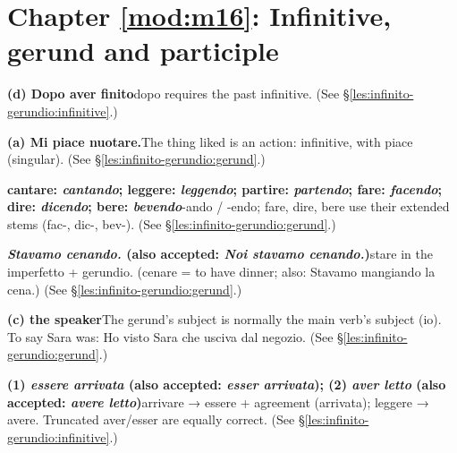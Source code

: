 \documentclass[11pt,a4paper,twoside,openright]{book}
\newcommand{\answerheading}[1]{\par\medskip\noindent{\sffamily\bfseries\small #1}\par\nopagebreak}
\begin{document}
\section*{Chapter \ref{mod:m16}: Infinitive, gerund and participle}

\answerheading{\S\ref{les:infinito-gerundio} Infinitive and gerund}\label{ans:infinito-gerundio}
\begin{answers}
\item\relax \textbf{(d) Dopo aver finito}\newline dopo requires the past infinitive. {\color{muted}(See \S\ref{les:infinito-gerundio:infinitive}.)}
\item\relax \textbf{(a) Mi piace nuotare.}\newline The thing liked is an action: infinitive, with piace (singular). {\color{muted}(See \S\ref{les:infinito-gerundio:gerund}.)}
\item\relax \textbf{cantare: \textit{cantando}; leggere: \textit{leggendo}; partire: \textit{partendo}; fare: \textit{facendo}; dire: \textit{dicendo}; bere: \textit{bevendo}}\newline -ando / -endo; fare, dire, bere use their extended stems (fac-, dic-, bev-). {\color{muted}(See \S\ref{les:infinito-gerundio:gerund}.)}
\item\relax \textbf{\textit{Stavamo cenando.} {\color{muted}(also accepted: \textit{Noi stavamo cenando.})}}\newline stare in the imperfetto + gerundio. (cenare = to have dinner; also: Stavamo mangiando la cena.) {\color{muted}(See \S\ref{les:infinito-gerundio:gerund}.)}
\item\relax \textbf{(c) the speaker}\newline The gerund's subject is normally the main verb's subject (io). To say Sara was: Ho visto Sara che usciva dal negozio. {\color{muted}(See \S\ref{les:infinito-gerundio:gerund}.)}
\item\relax \textbf{(1) \textit{essere arrivata} {\color{muted}(also accepted: \textit{esser arrivata})}; (2) \textit{aver letto} {\color{muted}(also accepted: \textit{avere letto})}}\newline arrivare → essere + agreement (arrivata); leggere → avere. Truncated aver/esser are equally correct. {\color{muted}(See \S\ref{les:infinito-gerundio:infinitive}.)}
\end{answers}
\end{document}
